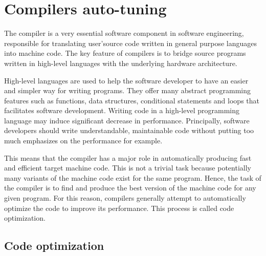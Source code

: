 \begin{itemize}
	
\end{itemize}






\section{Compilers auto-tuning}
\label{bg:Compilers auto-tuning}
The compiler is a very essential software component in software engineering, responsible for translating user'source code written in general purpose languages into machine code. The key feature of compilers is to bridge source programs written in high-level languages with the underlying hardware architecture.

High-level languages are used to help the software developer to have an easier and simpler way for writing programs. They offer many abstract programming features such as functions, data structures, conditional statements and loops that facilitates software development.
Writing code in a high-level programming language may induce significant decrease in performance. Principally, software developers should write understandable, maintainable code without putting too much emphasizes on the performance for example. 

This means that the compiler has a major role in automatically producing fast and efficient target machine code. This is not a trivial task because potentially many variants of the machine code exist for the same program. Hence, the task of the compiler is to find and produce the best version of the machine code for any given program. For this reason, compilers generally attempt to automatically optimize the code to improve its performance.
This process is called code optimization. 

\subsection{Code optimization}

